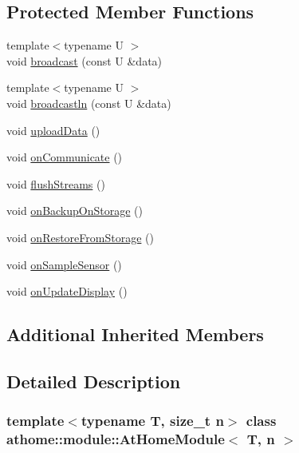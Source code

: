 \subsection*{Protected Member Functions}
\begin{DoxyCompactItemize}
\item 
{\footnotesize template$<$typename U $>$ }\\void \mbox{\hyperlink{classathome_1_1module_1_1_at_home_module_a22f6afbe9594849ecccae5b9f4dfe47d}{broadcast}} (const U \&data)
\item 
{\footnotesize template$<$typename U $>$ }\\void \mbox{\hyperlink{classathome_1_1module_1_1_at_home_module_a863a9efaa6d10169d1888278cbc70175}{broadcastln}} (const U \&data)
\item 
void \mbox{\hyperlink{classathome_1_1module_1_1_at_home_module_a4fd5a07603ff4cb512d201352aa2be0a}{upload\+Data}} ()
\item 
void \mbox{\hyperlink{classathome_1_1module_1_1_at_home_module_ad8da3ff2774cee42f1d45cd12912c937}{on\+Communicate}} ()
\item 
void \mbox{\hyperlink{classathome_1_1module_1_1_at_home_module_ad6e64ed8ff0c2daf0e8bb935b0a8e127}{flush\+Streams}} ()
\item 
void \mbox{\hyperlink{classathome_1_1module_1_1_at_home_module_aea6f4c8bdb27fa27915aa63185888f78}{on\+Backup\+On\+Storage}} ()
\item 
void \mbox{\hyperlink{classathome_1_1module_1_1_at_home_module_a7608679045f46ef0c07d7eab430d755b}{on\+Restore\+From\+Storage}} ()
\item 
void \mbox{\hyperlink{classathome_1_1module_1_1_at_home_module_a0c78d6ba7b9784d1a895bd9f109bd048}{on\+Sample\+Sensor}} ()
\item 
void \mbox{\hyperlink{classathome_1_1module_1_1_at_home_module_a78fdbc14589f82531bd08baeb2e3cfb1}{on\+Update\+Display}} ()
\end{DoxyCompactItemize}
\subsection*{Additional Inherited Members}


\subsection{Detailed Description}
\subsubsection*{template$<$typename T, size\+\_\+t n$>$\newline
class athome\+::module\+::\+At\+Home\+Module$<$ T, n $>$}

